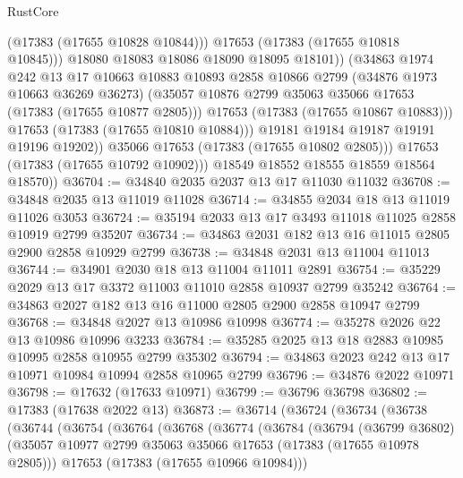 \begin{lexlean}{RustCore}
\begin{coremodule}
                          (@17383 (@17655 @10828 @10844)))
                        @17653
                        (@17383 (@17655 @10818 @10845)))
                      @18080
                      @18083
                      @18086
                      @18090
                      @18095
                      @18101))
                  (@34863
                    @1974
                    @242
                    @13
                    @17
                    @10663
                    @10883
                    @10893
                    @2858
                    @10866
                    @2799
                    (@34876 @1973 @10663 @36269 @36273)
                    (@35057 @10876 @2799 @35063 @35066 @17653 (@17383 (@17655 @10877 @2805)))
                    @17653
                    (@17383 (@17655 @10867 @10883)))
                  @17653
                  (@17383 (@17655 @10810 @10884)))
                @19181
                @19184
                @19187
                @19191
                @19196
                @19202))
            @35066
            @17653
            (@17383 (@17655 @10802 @2805)))
          @17653
          (@17383 (@17655 @10792 @10902)))
        @18549
        @18552
        @18555
        @18559
        @18564
        @18570))
@36704 := @34840 @2035 @2037 @13 @17 @11030 @11032
@36708 := @34848 @2035 @13 @11019 @11028
@36714 := @34855 @2034 @18 @13 @11019 @11026 @3053
@36724 := @35194 @2033 @13 @17 @3493 @11018 @11025 @2858 @10919 @2799 @35207
@36734 := @34863 @2031 @182 @13 @16 @11015 @2805 @2900 @2858 @10929 @2799
@36738 := @34848 @2031 @13 @11004 @11013
@36744 := @34901 @2030 @18 @13 @11004 @11011 @2891
@36754 := @35229 @2029 @13 @17 @3372 @11003 @11010 @2858 @10937 @2799 @35242
@36764 := @34863 @2027 @182 @13 @16 @11000 @2805 @2900 @2858 @10947 @2799
@36768 := @34848 @2027 @13 @10986 @10998
@36774 := @35278 @2026 @22 @13 @10986 @10996 @3233
@36784 := @35285 @2025 @13 @18 @2883 @10985 @10995 @2858 @10955 @2799 @35302
@36794 := @34863 @2023 @242 @13 @17 @10971 @10984 @10994 @2858 @10965 @2799
@36796 := @34876 @2022 @10971
@36798 := @17632 (@17633 @10971)
@36799 := @36796 @36798
@36802 := @17383 (@17638 @2022 @13)
@36873 := @36714
    (@36724
      (@36734
        (@36738
          (@36744
            (@36754
              (@36764
                (@36768
                  (@36774
                    (@36784
                      (@36794
                        (@36799 @36802)
                        (@35057 @10977 @2799 @35063 @35066 @17653 (@17383 (@17655 @10978 @2805)))
                        @17653
                        (@17383 (@17655 @10966 @10984)))

\end{coremodule}
\end{lexlean}
